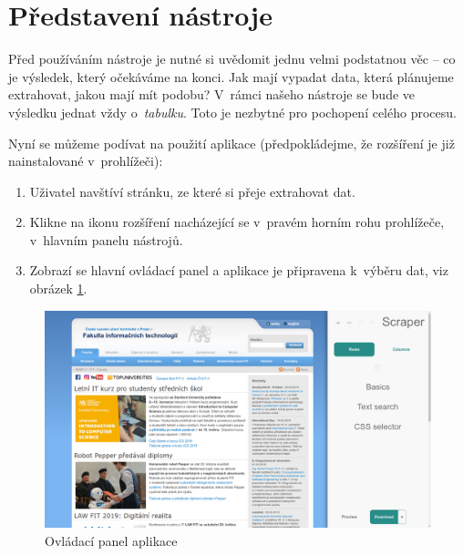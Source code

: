 \documentclass[thesis=B,czech]{FITthesis}[2012/06/26]
\begin{document}
\section{Představení nástroje}
Před používáním nástroje je nutné si uvědomit jednu velmi podstatnou věc -- co je výsledek, který očekáváme na konci. Jak mají vypadat data, která plánujeme extrahovat, jakou mají mít podobu? V~rámci našeho nástroje se bude ve výsledku jednat vždy o~\emph{tabulku}. Toto je nezbytné pro pochopení celého procesu.

Nyní se můžeme podívat na použití aplikace (předpokládejme, že rozšíření je již nainstalované v~prohlížeči):
\begin{enumerate}
	\item Uživatel navštíví stránku, ze které si přeje extrahovat dat.
	\item Klikne na ikonu rozšíření nacházející se v~pravém horním rohu prohlížeče, v~hlavním panelu nástrojů.
	\item Zobrazí se hlavní ovládací panel a aplikace je připravena k~výběru dat, viz obrázek \ref{fig:scraper_control_panel}.
\end{enumerate}
\begin{figure}[b]
	\includegraphics[width=\linewidth]{images/Scraper_control_panel.png}
	\caption{Ovládací panel aplikace}
	\label{fig:scraper_control_panel}
\end{figure}
\end{document}
